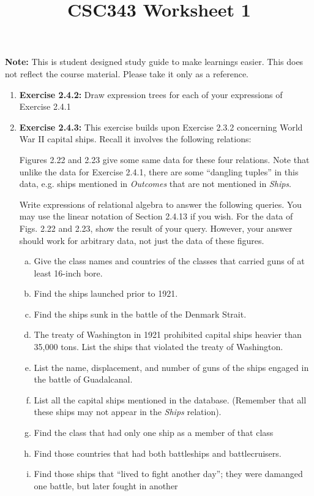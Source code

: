 \documentclass[12pt]{article}
\begin{document}
\title{CSC343 Worksheet 1}
\maketitle

\noindent \textbf{Note:} This is student designed study guide to make learnings easier.
This does not reflect the course material. Please take it only as a reference.

\begin{enumerate}[1.]
    \item \textbf{Exercise 2.4.2:} Draw expression trees for each of your expressions
    of Exercise 2.4.1

    \item \textbf{Exercise 2.4.3:} This exercise builds upon Exercise 2.3.2 concerning
    World War II capital ships. Recall it involves the following relations:


    Figures 2.22 and 2.23 give some same data for these four relations. Note that unlike
    the data for Exercise 2.4.1, there are some ``dangling tuples'' in this data,
    e.g. ships mentioned in \textit{Outcomes} that are not mentioned in \textit{Ships}.

    \bigskip

    Write expressions of relational algebra to answer the following queries. You
    may use the linear notation of Section 2.4.13 if you wish. For the data of Figs.
    2.22 and 2.23, show the result of your query. However, your answer should work
    for arbitrary data, not just the data of these figures.

    \bigskip

    \begin{enumerate}[a)]
        \item Give the class names and countries of the classes that carried guns
        of at least 16-inch bore.
        \item Find the ships launched prior to 1921.
        \item Find the ships sunk in the battle of the Denmark Strait.
        \item The treaty of Washington in 1921 prohibited capital ships heavier than
        35,000 tons. List the ships that violated the treaty of Washington.
        \item List the name, displacement, and number of guns of the ships engaged
        in the battle of Guadalcanal.
        \item List all the capital ships mentioned in the database. (Remember that all
        these ships may not appear in the \textit{Ships} relation).
        \item Find the class that had only one ship as a member of that class
        \item Find those countries that had both battleships and battlecruisers.
        \item Find those ships that ``lived to fight another day''; they were damanged
        one battle, but later fought in another
    \end{enumerate}


\end{enumerate}
\end{document}
